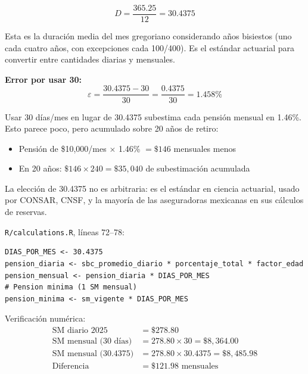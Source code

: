\documentclass[11pt,a4paper]{report}
\theoremstyle{remark}
\begin{document}
\begin{tcolorbox}[colback=blue!5!white, colframe=blue!75!black, title=\textbf{Definici\'on Formal}]
\begin{equation}
D = \frac{365.25}{12} = 30.4375
\label{eq:dias_mes}
\end{equation}

Esta es la duraci\'on media del mes gregoriano considerando a\~nos bisiestos (uno cada cuatro a\~nos, con excepciones cada 100/400). Es el est\'andar actuarial para convertir entre cantidades diarias y mensuales.

\textbf{Error por usar 30:}
\begin{equation}
\varepsilon = \frac{30.4375 - 30}{30} = \frac{0.4375}{30} = 1.458\%
\end{equation}
\end{tcolorbox}

\begin{tcolorbox}[colback=green!5!white, colframe=green!50!black, title=\textbf{Intuici\'on}]
Usar 30 d\'ias/mes en lugar de 30.4375 subestima cada pensi\'on mensual en 1.46\%. Esto parece poco, pero acumulado sobre 20 a\~nos de retiro:

\begin{itemize}
  \item Pensi\'on de \$10,000/mes $\times$ 1.46\% $= \$146$ mensuales menos
  \item En 20 a\~nos: $\$146 \times 240 = \$35{,}040$ de subestimaci\'on acumulada
\end{itemize}

La elecci\'on de 30.4375 no es arbitraria: es el est\'andar en ciencia actuarial, usado por CONSAR, CNSF, y la mayor\'ia de las aseguradoras mexicanas en sus c\'alculos de reservas.
\end{tcolorbox}

\begin{tcolorbox}[colback=orange!5!white, colframe=orange!75!black, title=\textbf{Aplicaci\'on en C\'odigo}]
\texttt{R/calculations.R}, l\'ineas 72--78:
\begin{lstlisting}
DIAS_POR_MES <- 30.4375
pension_diaria <- sbc_promedio_diario * porcentaje_total * factor_edad
pension_mensual <- pension_diaria * DIAS_POR_MES
# Pension minima (1 SM mensual)
pension_minima <- sm_vigente * DIAS_POR_MES
\end{lstlisting}

Verificaci\'on num\'erica:
\begin{align*}
\text{SM diario 2025} &= \$278.80 \\
\text{SM mensual (30 d\'ias)} &= 278.80 \times 30 = \$8{,}364.00 \\
\text{SM mensual (30.4375)} &= 278.80 \times 30.4375 = \$8{,}485.98 \\
\text{Diferencia} &= \$121.98 \text{ mensuales}
\end{align*}
\end{tcolorbox}
\end{document}
